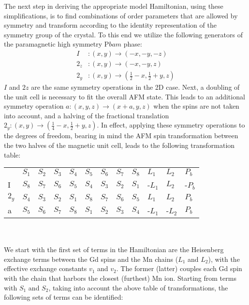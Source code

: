 The next step in deriving the appropriate model Hamiltonian, using these simplifications, is to find combinations of order parameters that are allowed by symmetry and transform according to the identity representation of the symmetry group of the crystal.
To this end we utilize the following generators of the paramagnetic high symmetry P$bam$ phase:
\begin{align}
	I &: (x, y) \rightarrow (-x, -y, -z)\\
	2_z &: (x, y) \rightarrow (-x, -y, z)\\
	2_y &: (x, y) \rightarrow (\frac{1}{2} - x, \frac{1}{2} + y, z)
\end{align}
$I$ and $2z$ are the same symmetry operations in the 2D case. Next, a doubling of the unit cell is necessary to fit the overall AFM state. This leads to an additional symmetry operation $a: (x, y, z) \rightarrow (x + a, y, z)$ when the spins are not taken into account, and a halving of the fractional translation $2_y: (x, y) \rightarrow (\frac{1}{4} - x, \frac{1}{2}+y, z)$.
In effect, applying these symmetry operations to the degrees of freedom, bearing in mind the AFM spin transformation between the two halves of the magnetic unit cell, leads to the following transformation table:
\begin{table}[h]
\centering
\begin{tabular}{|l|lllllllllll|}
\cline{1-12}
 & $S_1$ & $S_2$ & $S_3$ & $S_4$ & $S_5$ & $S_6$ & $S_7$ & $S_8$ & $L_1$ & $L_2$ & $P_b$ \\ \cline{1-12}
I & $S_8$ & $S_7$ & $S_6$ & $S_5$ & $S_4$ & $S_3$ & $S_2$ & $S_1$ & -$L_1$ & $L_2$ & -$P_b$ \\ \cline{1-12}
$2_y$ & $S_4$ & $S_3$ & $S_2$ & $S_1$ & $S_8$ & $S_7$ & $S_6$ & $S_5$ & $L_1$ & $L_2$ & $P_b$ \\ \cline{1-12}
a & $S_5$ & $S_6$ & $S_7$ & $S_8$ & $S_1$ & $S_2$ & $S_3$ & $S_4$ & -$L_1$ & -$L_2$ & $P_b$ \\ \cline{1-12}
\end{tabular}
\end{table}\\\\
We start with the first set of terms in the Hamiltonian are the Heisenberg exchange terms between the Gd spins and the Mn chains ($L_1$ and $L_2$), with the effective exchange constants $v_1$ and $v_2$.
The former (latter) couples each Gd spin with the chain that harbors the closest (furthest) Mn ion.
Starting from terms with $S_1$ and $S_2$, taking into account the above table of transformations, the following sets of terms can be identified:
